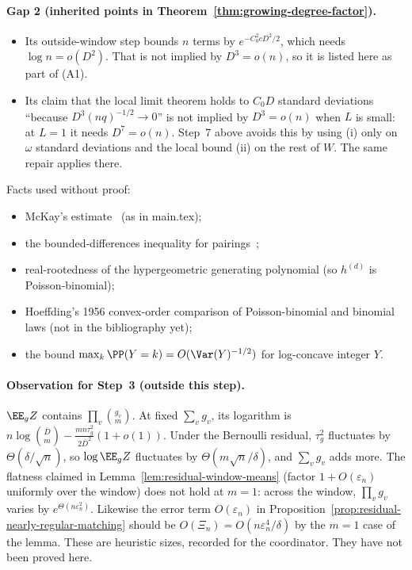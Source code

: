 \paragraph{Gap 2 (inherited points in Theorem~\ref{thm:growing-degree-factor}).}
\begin{itemize}
\item Its outside-window step bounds \(n\) terms by \(e^{-C_0^2cD^2/2}\), which
needs \(\log n=o(D^2)\). That is not implied by \(D^3=o(n)\), so it is
listed here as part of (A1).
\item Its claim that the local limit theorem holds to \(C_0D\) standard
deviations ``because \(D^3(nq)^{-1/2}\to0\)'' is not implied by \(D^3=o(n)\) when
\(L\) is small: at \(L=1\) it needs \(D^7=o(n)\). Step~7 above avoids this by
using (i) only on \(\omega\) standard deviations and the local bound (ii) on the
rest of \(W\). The same repair applies there.
\end{itemize}
Facts used without proof:
\begin{itemize}
\item McKay's estimate~\cite[Theorem~4.6]{McK85} (as in main.tex);
\item the bounded-differences inequality for pairings~\cite[Theorem~2.19]{Wormald99};
\item real-rootedness of the hypergeometric generating polynomial (so \(h^{(d)}\) is Poisson-binomial);
\item Hoeffding's 1956 convex-order comparison of Poisson-binomial and binomial laws (not in the bibliography yet);
\item the bound \(\max_k\PP(Y=k)=O(\Var(Y)^{-1/2})\) for log-concave integer \(Y\).
\end{itemize}

\paragraph{Observation for Step~3 (outside this step).}
\(\EE_gZ\) contains \(\prod_v\binom{g_v}{m}\). At fixed \(\sum_vg_v\), its logarithm is
\(n\log\binom{\bar D}{m}-\frac{mn\tau_g^2}{2\bar D^2}(1+o(1))\). Under the Bernoulli
residual, \(\tau_g^2\) fluctuates by \(\Theta(\delta/\sqrt n)\), so
\(\log\EE_gZ\) fluctuates by \(\Theta(m\sqrt n/\delta)\), and \(\sum_vg_v\) adds
more. The flatness claimed in Lemma~\ref{lem:residual-window-means} (factor
\(1+O(\varepsilon_n)\) uniformly over the window) does not hold at \(m=1\): across the
window, \(\prod_vg_v\) varies by \(e^{\Theta(n\varepsilon_n^2)}\). Likewise the error
term \(O(\varepsilon_n)\) in Proposition~\ref{prop:residual-nearly-regular-matching}
should be \(O(\Xi_n)=O(n\varepsilon_n^4/\delta)\) by the \(m=1\) case of the lemma.
These are heuristic sizes, recorded for the coordinator. They have not been proved here.
